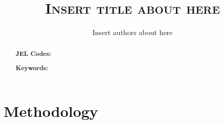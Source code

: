\documentclass[12pt,a4paper]{article}
\title{\textsc{
{\LARGE Insert title about here}
}}
\author[1]{
{ \bx \bx \bx Insert authors about here
}

%
}
\date{}  %
\begin{document}
\maketitle
\thispagestyle{empty}  %


\begin{abstract}
%

\bigskip
\noindent\textbf{JEL Codes:} 

\noindent\textbf{Keywords:}
\end{abstract}


\newpage
\tableofcontents
\thispagestyle{empty}  %

\newpage
\setcounter{page}{1}
%
%
%

%



\section{Methodology}



\end{document}
